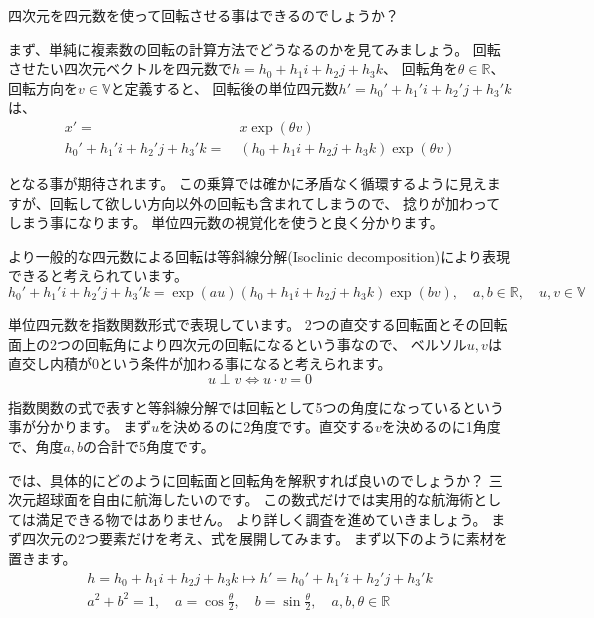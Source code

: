\documentclass[a4paper,12pt,notitlepage]{jsreport}
\begin{document}
四次元を四元数を使って回転させる事はできるのでしょうか？

まず、単純に複素数の回転の計算方法でどうなるのかを見てみましょう。
回転させたい四次元ベクトルを四元数で$h=h_0+h_1i+h_2j+h_3k$、
回転角を$\theta\in\mathbb{R}$、回転方向を$v\in\mathbb{V}$と定義すると、
回転後の単位四元数$h'=h_0'+h_1'i+h_2'j+h_3'k$は、
\begin{equation}
  \begin{split}
    x'=~&x\exp(\theta v)\\
    h_0'+h_1'i+h_2'j+h_3'k=~&(h_0+h_1i+h_2j+h_3k)\exp(\theta v)
  \end{split}
\end{equation}

となる事が期待されます。
この乗算では確かに矛盾なく循環するように見えますが、回転して欲しい方向以外の回転も含まれてしまうので、
捻りが加わってしまう事になります。
単位四元数の視覚化を使うと良く分かります。

より一般的な四元数による回転は等斜線分解(Isoclinic decomposition)により表現できると考えられています。
\begin{equation}
  h_0'+h_1'i+h_2'j+h_3'k=\exp(au)(h_0+h_1i+h_2j+h_3k)\exp(bv),\quad a,b\in\mathbb{R},\quad u,v\in\mathbb{V}
\end{equation}

単位四元数を指数関数形式で表現しています。
2つの直交する回転面とその回転面上の2つの回転角により四次元の回転になるという事なので、
ベルソル$u,v$は直交し内積が$0$という条件が加わる事になると考えられます。
\begin{equation}
  u \perp v \iff u \cdot v=0
\end{equation}

指数関数の式で表すと等斜線分解では回転として5つの角度になっているという事が分かります。
まず$u$を決めるのに2角度です。直交する$v$を決めるのに1角度で、角度$a,b$の合計で5角度です。

では、具体的にどのように回転面と回転角を解釈すれば良いのでしょうか？
三次元超球面を自由に航海したいのです。
この数式だけでは実用的な航海術としては満足できる物ではありません。
より詳しく調査を進めていきましょう。
まず四次元の2つ要素だけを考え、式を展開してみます。
まず以下のように素材を置きます。
\begin{gather}
  h=h_0+h_1i+h_2j+h_3k \mapsto h'=h_0'+h_1'i+h_2'j+h_3'k\\
  a^2+b^2=1,\quad a=\cos\frac{\theta}{2},\quad b=\sin\frac{\theta}{2},
  \quad a,b,\theta\in\mathbb{R}
\end{gather}
\end{document}
